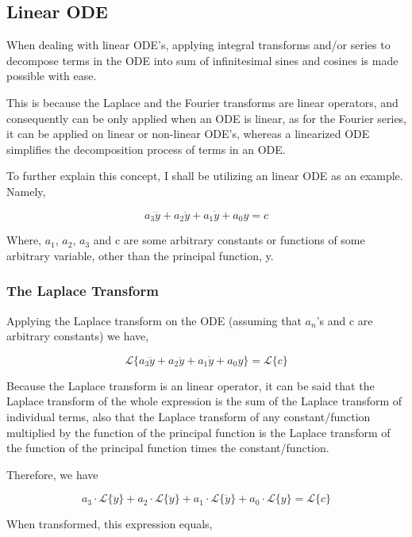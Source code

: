 

\subsection{{Linear ODE}}

	{When dealing with linear ODE's, applying integral transforms and/or series to decompose terms in the ODE into sum of infinitesimal sines and cosines is made possible with ease.} 
	
	{This is because the Laplace and the Fourier transforms are linear operators, and consequently can be only applied when an ODE is linear, as for the Fourier series, it can be applied on linear or non-linear ODE's, whereas a linearized ODE simplifies the decomposition process of terms in an ODE.}

	{To further explain this concept, I shall be utilizing an linear ODE as an example. Namely,}
	
		$$a_3\dddot{y} + a_2\ddot{y} + a_1\dot{y} + a_0y = c$$

	{Where, $a_1$, $a_2$, $a_3$ and c are some arbitrary constants or functions of some arbitrary variable, other than the principal function, y.}

	\subsubsection{{The Laplace Transform}}	
		
		{Applying the Laplace transform on the ODE (assuming that $a_n$'s and c are arbitrary constants) we have,}
		
			$$\mathcal{L}\{a_3\dddot{y} + a_2\ddot{y} + a_1\dot{y} + a_0y\} = \mathcal{L}\{c\}$$		
			
		{Because the Laplace transform is an linear operator, it can be said that the Laplace transform of the whole expression is the sum of the Laplace transform of individual terms, also that the Laplace transform of any constant/function multiplied by the function of the principal function is the Laplace transform of the function of the principal function times the constant/function.}			
			
		{Therefore, we have}			
			
			$$a_3\cdot\mathcal{L}\{\dddot{y}\} + a_2\cdot\mathcal{L}\{\ddot{y}\} + a_1\cdot\mathcal{L}\{\dot{y}\} + a_0\cdot\mathcal{L}\{y\} = \mathcal{L}\{c\}$$
		
		{When transformed, this expression equals,}		
		
